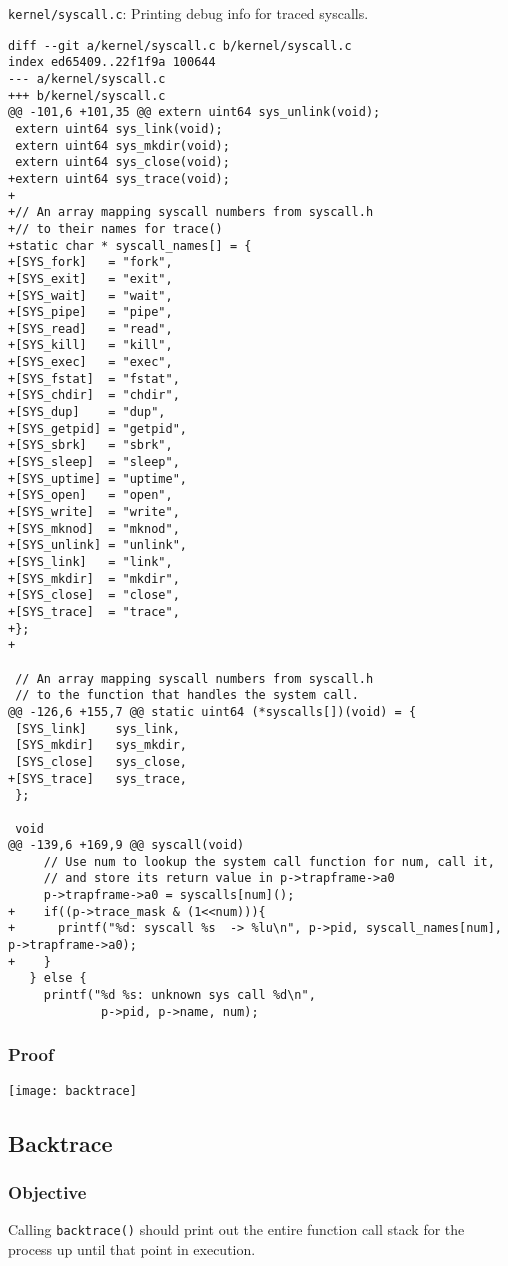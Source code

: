 \documentclass{article}
\begin{document}
\texttt{kernel/syscall.c}: Printing debug info for traced syscalls.
\begin{verbatim}
diff --git a/kernel/syscall.c b/kernel/syscall.c
index ed65409..22f1f9a 100644
--- a/kernel/syscall.c
+++ b/kernel/syscall.c
@@ -101,6 +101,35 @@ extern uint64 sys_unlink(void);
 extern uint64 sys_link(void);
 extern uint64 sys_mkdir(void);
 extern uint64 sys_close(void);
+extern uint64 sys_trace(void);
+
+// An array mapping syscall numbers from syscall.h
+// to their names for trace() 
+static char * syscall_names[] = {
+[SYS_fork]   = "fork",
+[SYS_exit]   = "exit",
+[SYS_wait]   = "wait",
+[SYS_pipe]   = "pipe",
+[SYS_read]   = "read",
+[SYS_kill]   = "kill",
+[SYS_exec]   = "exec",
+[SYS_fstat]  = "fstat",
+[SYS_chdir]  = "chdir",
+[SYS_dup]    = "dup",
+[SYS_getpid] = "getpid",
+[SYS_sbrk]   = "sbrk",
+[SYS_sleep]  = "sleep",
+[SYS_uptime] = "uptime",
+[SYS_open]   = "open",
+[SYS_write]  = "write",
+[SYS_mknod]  = "mknod",
+[SYS_unlink] = "unlink",
+[SYS_link]   = "link",
+[SYS_mkdir]  = "mkdir",
+[SYS_close]  = "close",
+[SYS_trace]  = "trace",
+};
+
 
 // An array mapping syscall numbers from syscall.h
 // to the function that handles the system call.
@@ -126,6 +155,7 @@ static uint64 (*syscalls[])(void) = {
 [SYS_link]    sys_link,
 [SYS_mkdir]   sys_mkdir,
 [SYS_close]   sys_close,
+[SYS_trace]   sys_trace,
 };
 
 void
@@ -139,6 +169,9 @@ syscall(void)
     // Use num to lookup the system call function for num, call it,
     // and store its return value in p->trapframe->a0
     p->trapframe->a0 = syscalls[num]();
+    if((p->trace_mask & (1<<num))){
+      printf("%d: syscall %s  -> %lu\n", p->pid, syscall_names[num], p->trapframe->a0);
+    }
   } else {
     printf("%d %s: unknown sys call %d\n",
             p->pid, p->name, num);
\end{verbatim}

\subsubsection*{Proof}
\texttt{[image: backtrace]}

\subsection{Backtrace}
\subsubsection*{Objective}
Calling \texttt{backtrace()} should print out the entire function call stack for the process up until that point in execution.
\end{document}
